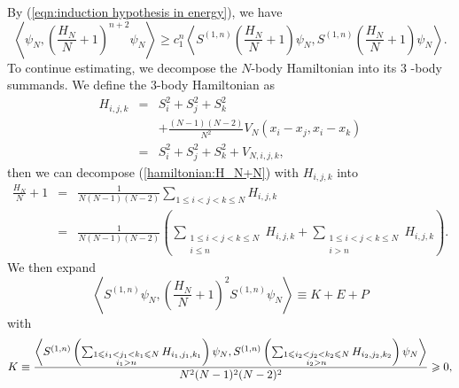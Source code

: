 \documentclass[12pt,letterpaper,leqno]{amsart}
\theoremstyle{plain}
\numberwithin{equation}{section}
\numberwithin{theorem}{section}
\numberwithin{proposition}{section}
\numberwithin{lemma}{section}
\numberwithin{corollary}{section}
\begin{document}
By (\ref{eqn:induction hypothesis in energy}), we have%
\begin{equation*}
\left\langle \psi _{N},\left( \frac{H_{N}}{N}+1\right) ^{n+2}\psi
_{N}\right\rangle \geqslant c_{1}^{n}\left\langle S^{(1,n)}\left( \frac{H_{N}%
}{N}+1\right) \psi _{N},S^{(1,n)}\left( \frac{H_{N}}{N}+1\right) \psi
_{N}\right\rangle .
\end{equation*}%
To continue estimating, we decompose the $N$-body Hamiltonian into its $3$%
-body summands. We define the $3$-body Hamiltonian as 
\begin{eqnarray*}
H_{i,j,k} &=&S_{i}^{2}+S_{j}^{2}+S_{k}^{2} \\
&&+\frac{(N-1)(N-2)}{N^{2}}V_{N}(x_{i}-x_{j},x_{i}-x_{k}) \\
&=&S_{i}^{2}+S_{j}^{2}+S_{k}^{2}+V_{N,i,j,k},
\end{eqnarray*}%
then we can decompose (\ref{hamiltonian:H_N+N}) with $H_{i,j,k}$ into%
\begin{eqnarray*}
\frac{H_{N}}{N}+1 &=&\frac{1}{N(N-1)(N-2)}\sum_{1\leqslant i<j<k\leqslant
N}H_{i,j,k} \\
&=&\frac{1}{N(N-1)(N-2)}\left( \sum_{\substack{ 1\leqslant i<j<k\leqslant N 
\\ i\leqslant n}}H_{i,j,k}+\sum_{\substack{ 1\leqslant i<j<k\leqslant N  \\ %
i>n}}H_{i,j,k}\right) .
\end{eqnarray*}%
We then expand 
\begin{equation*}
\left\langle S^{(1,n)}\psi _{N},\left( \frac{H_{N}}{N}+1\right)
^{2}S^{(1,n)}\psi _{N}\right\rangle \equiv K+E+P
\end{equation*}%
with%
\begin{equation*}
K\equiv \frac{\left\langle S^{(1,n)}\left( \sum_{\substack{ 1\leqslant
i_{1}<j_{1}<k_{1}\leqslant N  \\ i_{1}>n}}H_{i_{1},j_{1},k_{1}}\right) \psi
_{N},S^{(1,n)}\left( \sum_{\substack{ 1\leqslant i_{2}<j_{2}<k_{2}\leqslant
N  \\ i_{2}>n}}H_{i_{2},j_{2},k_{2}}\right) \psi _{N}\right\rangle }{%
N^{2}(N-1)^{2}(N-2)^{2}}\geqslant 0,
\end{equation*}
\end{document}
